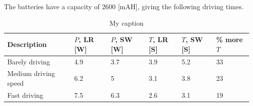 The batteries have a capacity of $2600$ [mAH], giving the following driving times.

\begin{table}[h]
\centering
\caption{My caption}
\label{my-label}
\begin{tabular}{|l|l|p{2cm}|p{2cm}|p{2cm}|p{2cm}|}
\hline
\textbf{Description} & $P$, LR {[}W{]} & $P$, SW {[}W{]} & $T$, LR [S]& $T$, SW [S] & \% more $T$ \\ \hline
Barely driving       & 4.9                         & 3.7                               & 3.9              & 5.2                      & 33                 \\ \hline
Medium driving speed & 6.2                         & 5                                 & 3.1              & 3.8                      & 23                 \\ \hline
Fast driving         & 7.5                         & 6.3                               & 2.6              & 3.1                      & 19                 \\ \hline
\end{tabular}
\end{table}

